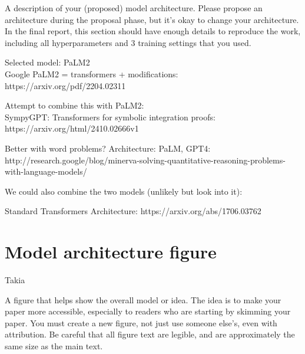 \documentclass{article}
\begin{document}
A description of your (proposed) model architecture.
Please propose an architecture during the proposal
phase, but it's okay to change your architecture. In the
final report, this section should have enough details to
reproduce the work, including all hyperparameters and 3 training settings that you used.

 
Selected model: PaLM2 \\
Google PaLM2 = transformers + modifications: https://arxiv.org/pdf/2204.02311

Attempt to combine this with PaLM2: \\
SympyGPT: Transformers for symbolic integration proofs: https://arxiv.org/html/2410.02666v1


Better with word problems?
Architecture: PaLM, GPT4: http://research.google/blog/minerva-solving-quantitative-reasoning-problems-with-language-models/

We could also combine the two models (unlikely but look into it):

Standard Transformers Architecture: https://arxiv.org/abs/1706.03762

\section{Model architecture figure}
Takia

A figure that helps show the overall model or idea. The
idea is to make your paper more accessible, especially
to readers who are starting by skimming your paper.
You must create a new figure, not just use someone
else's, even with attribution. Be careful that all figure
text are legible, and are approximately the same size
as the main text.
\end{document}
